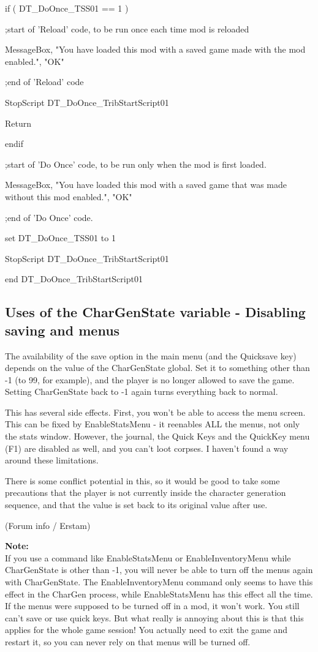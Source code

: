 \documentclass[
]{article}
\begin{document}
if ( DT\_DoOnce\_TSS01 == 1 )

;start of 'Reload' code, to be run once each time mod is reloaded

MessageBox, "You have loaded this mod with a saved game made with the
mod enabled.", "OK"

;end of 'Reload' code

StopScript DT\_DoOnce\_TribStartScript01

Return

endif

;start of 'Do Once' code, to be run only when the mod is first loaded.

MessageBox, "You have loaded this mod with a saved game that was made
without this mod enabled.", "OK"

;end of 'Do Once' code.

set DT\_DoOnce\_TSS01 to 1

StopScript DT\_DoOnce\_TribStartScript01

end DT\_DoOnce\_TribStartScript01

\hypertarget{uses-of-the-chargenstate-variable---disabling-saving-and-menus}{%
\subsection{Uses of the CharGenState variable - Disabling saving and
menus}\label{uses-of-the-chargenstate-variable---disabling-saving-and-menus}}

The availability of the save option in the main menu (and the Quicksave
key) depends on the value of the CharGenState global. Set it to
something other than -1 (to 99, for example), and the player is no
longer allowed to save the game. Setting CharGenState back to -1 again
turns everything back to normal.

This has several side effects. First, you won't be able to access the
menu screen. This can be fixed by EnableStatsMenu - it reenables ALL the
menus, not only the stats window. However, the journal, the Quick Keys
and the QuickKey menu (F1) are disabled as well, and you can't loot
corpses. I haven't found a way around these limitations.

There is some conflict potential in this, so it would be good to take
some precautions that the player is not currently inside the character
generation sequence, and that the value is set back to its original
value after use.

(Forum info / Erstam)

\textbf{Note:\\
}If you use a command like EnableStatsMenu or EnableInventoryMenu while
CharGenState is other than -1, you will never be able to turn off the
menus again with CharGenState. The EnableInventoryMenu command only
seems to have this effect in the CharGen process, while EnableStatsMenu
has this effect all the time. If the menus were supposed to be turned
off in a mod, it won't work. You still can't save or use quick keys. But
what really is annoying about this is that this applies for the whole
game session! You actually need to exit the game and restart it, so you
can never rely on that menus will be turned off.
\end{document}

